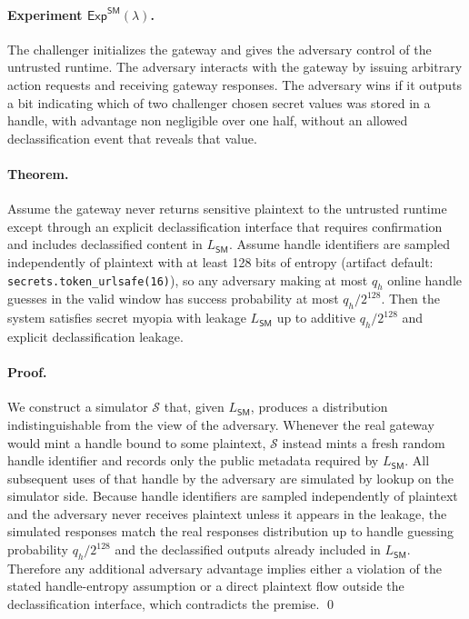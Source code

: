 \paragraph{Experiment $\mathsf{Exp}^{\mathsf{SM}}(\lambda)$.}
The challenger initializes the gateway and gives the adversary control of the untrusted runtime.
The adversary interacts with the gateway by issuing arbitrary action requests and receiving gateway
responses.
The adversary wins if it outputs a bit indicating which of two challenger chosen secret values was
stored in a handle, with advantage non negligible over one half, without an allowed declassification
event that reveals that value.

\paragraph{Theorem.}
\begin{theorem}\label{thm:sm}
Assume the gateway never returns sensitive plaintext to the untrusted runtime except through an
explicit declassification interface that requires confirmation and includes declassified content in
$L_{\mathsf{SM}}$.
Assume handle identifiers are sampled independently of plaintext with at least 128 bits of entropy
(artifact default: \texttt{secrets.token\_urlsafe(16)}), so any adversary making at most $q_h$
online handle guesses in the valid window has success probability at most $q_h/2^{128}$.
Then the system satisfies secret myopia with leakage $L_{\mathsf{SM}}$ up to additive
$q_h/2^{128}$ and explicit declassification leakage.
\end{theorem}

\paragraph{Proof.}
We construct a simulator $\mathcal{S}$ that, given $L_{\mathsf{SM}}$, produces a distribution
indistinguishable from the view of the adversary.
Whenever the real gateway would mint a handle bound to some plaintext, $\mathcal{S}$ instead mints a
fresh random handle identifier and records only the public metadata required by $L_{\mathsf{SM}}$.
All subsequent uses of that handle by the adversary are simulated by lookup on the simulator side.
Because handle identifiers are sampled independently of plaintext and the adversary never receives
plaintext unless it appears in the leakage, the simulated responses match the real responses
distribution up to handle guessing probability $q_h/2^{128}$ and the declassified outputs already
included in $L_{\mathsf{SM}}$.
Therefore any additional adversary advantage implies either a violation of the stated handle-entropy
assumption or a direct plaintext flow outside the declassification interface, which contradicts the
premise.
\qed

